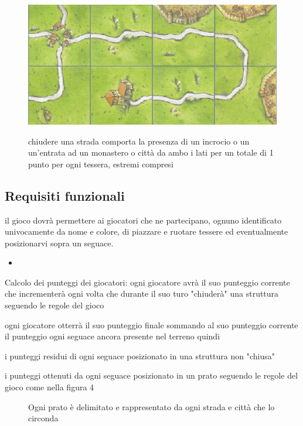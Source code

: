 \begin{figure}[]
    {\includegraphics[]{images/Strada.png}}

    \caption{chiudere una strada comporta la presenza di un incrocio o un un’entrata ad un monastero o città da ambo i lati per un totale di 1 punto per ogni tessera, estremi compresi}
\end{figure}

\subsection*{Requisiti funzionali}
il gioco dovrà permettere ai giocatori che ne partecipano, ognuno identificato univocamente da nome e colore, di piazzare e ruotare tessere ed eventualmente posizionarvi sopra un seguace.

\begin{itemize}
\item 
\end{itemize}

Calcolo dei punteggi dei giocatori: ogni giocatore avrà il suo punteggio corrente che incrementerà ogni volta che durante il suo turo "chiuderà" una struttura seguendo le regole del gioco

ogni giocatore otterrà il suo punteggio finale sommando al suo punteggio corrente il punteggio ogni seguace ancora presente nel terreno quindi


\subitem i punteggi residui di ogni seguace posizionato in una struttura non "chiusa"

\subitem i punteggi ottenuti da ogni seguace posizionato in un prato seguendo le regole del gioco come nella figura 4

\begin{figure}[]

    \caption{Ogni prato è delimitato e rappresentato da ogni strada e città che lo circonda}
    
\end{figure}

